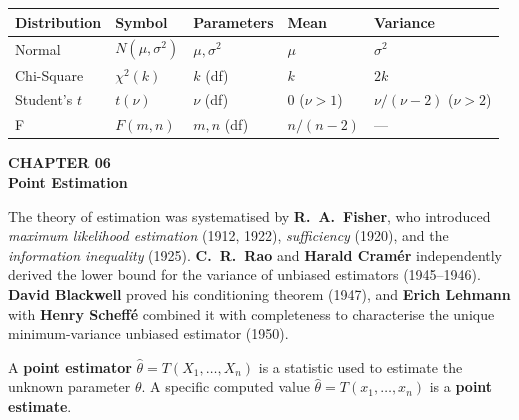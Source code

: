 \documentclass[12pt]{article}
\newcommand{\hcell}[1]{\textbf{\color{white}#1}}
\begin{document}
\begin{center}{\small
\begin{tabular}{|l|C{2cm}|C{2cm}|C{2.5cm}|C{2.5cm}|}
\hline{}\hcell{Distribution}&\hcell{Symbol}&\hcell{Parameters}&\hcell{Mean}&\hcell{Variance}\\\hline
Normal&$N(\mu,\sigma^2)$&$\mu,\sigma^2$&$\mu$&$\sigma^2$\\\hline
Chi-Square&$\chi^2(k)$&$k$ (df)&$k$&$2k$\\\hline
Student's $t$&$t(\nu)$&$\nu$ (df)&0 ($\nu>1$)&$\nu/(\nu-2)$ ($\nu>2$)\\\hline
F&$F(m,n)$&$m,n$ (df)&$n/(n-2)$&---\\\hline
\end{tabular}}
\end{center}

\newpage

\begin{tcolorbox}[enhanced,arc=0pt,boxrule=0pt,colback=primary,colframe=primary,
  left=16pt,right=16pt,top=14pt,bottom=10pt,borderline south={4pt}{0pt}{accent}]
  {\color{accent!70}\small\bfseries CHAPTER 06}\\[4pt]
  {\LARGE\bfseries\color{white}Point Estimation}
\end{tcolorbox}
\vspace{10pt}

\begin{histbox}
The theory of estimation was systematised by \textbf{R.\ A.\ Fisher}, who introduced \textit{maximum likelihood estimation} (1912, 1922), \textit{sufficiency} (1920), and the \textit{information inequality} (1925). \textbf{C.\ R.\ Rao} and \textbf{Harald Cramér} independently derived the lower bound for the variance of unbiased estimators (1945--1946). \textbf{David Blackwell} proved his conditioning theorem (1947), and \textbf{Erich Lehmann} with \textbf{Henry Scheffé} combined it with completeness to characterise the unique minimum-variance unbiased estimator (1950).
\end{histbox}

\bigskip

\begin{defbox}
A \textbf{point estimator} $\hat\theta=T(X_1,\ldots,X_n)$ is a statistic used to estimate the unknown parameter $\theta$. A specific computed value $\hat\theta=T(x_1,\ldots,x_n)$ is a \textbf{point estimate}.
\end{defbox}
\end{document}
